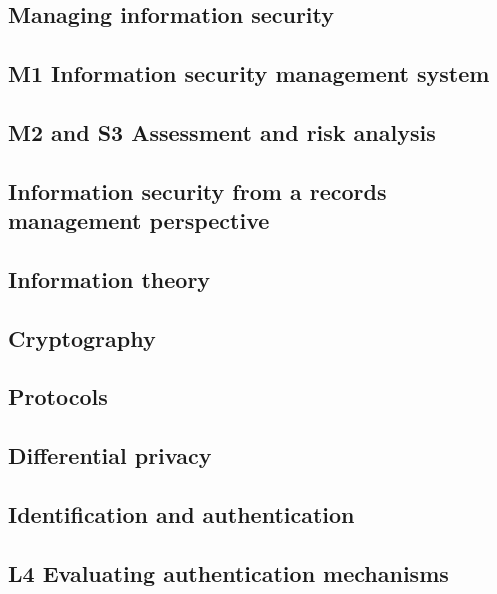 \subsection{Managing information security}


\subsection{M1 Information security management system}


\subsection{M2 and S3 Assessment and risk analysis}


\subsection{Information security from a records management perspective}


\subsection{Information theory}


\subsection{Cryptography}


\subsection{Protocols}


\subsection{Differential privacy}


\subsection{Identification and authentication}


\subsection{L4 Evaluating authentication mechanisms}


